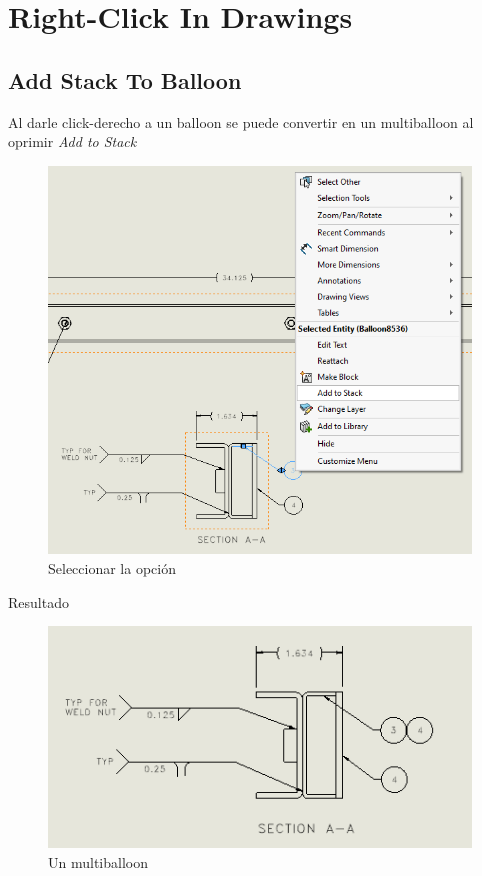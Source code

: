 \documentclass{report}
\begin{document}
\chapter{Right-Click In Drawings}

\section{Add Stack To Balloon}

Al darle click-derecho a un balloon se puede convertir en un multiballoon al oprimir \emph{Add to Stack}

\begin{figure}[H]
	\centering
	\includegraphics[width=0.85\linewidth, height=0.5\textheight,keepaspectratio]{Imagenes/solidworks_addtostack01}
	\caption{Seleccionar la opción}
	\label{fig:solidworksaddtostack01}
\end{figure}

{\LARGE Resultado}

\begin{figure}[H]
	\centering
	\includegraphics[width=0.85\linewidth, height=0.5\textheight,keepaspectratio]{Imagenes/solidworks_addtostack02}
	\caption{Un multiballoon}
	\label{fig:solidworksaddtostack02}
\end{figure}
\end{document}
